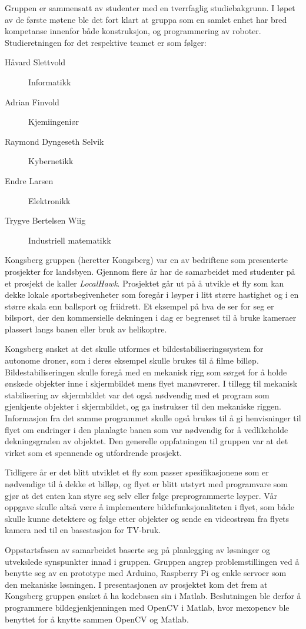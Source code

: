 Gruppen er sammensatt av studenter med en tverrfaglig studiebakgrunn. I løpet av de første møtene ble det fort klart at gruppa som en samlet enhet har bred kompetanse innenfor både konstruksjon, og programmering av roboter. Studieretningen for det respektive teamet er som følger:
%
\begin{description}
	\item[Håvard Slettvold] Informatikk
	\item[Adrian Finvold] Kjemiingeniør
	\item[Raymond Dyngeseth Selvik] Kybernetikk
	\item[Endre Larsen] Elektronikk
	\item[Trygve Bertelsen Wiig] Industriell matematikk
\end{description}
%
Kongsberg gruppen (heretter Kongsberg) var en av bedriftene som presenterte prosjekter for landsbyen. Gjennom flere år har de samarbeidet med studenter på et prosjekt de kaller \emph{LocalHawk}. Prosjektet går ut på å utvikle et fly som kan dekke lokale sportsbegivenheter som foregår i løyper i litt større hastighet og i en større skala enn ballsport og friidrett. Et eksempel på hva de ser for seg er bilsport, der den kommersielle dekningen i dag er begrenset til å bruke kameraer plassert langs banen eller bruk av helikoptre. 

Kongsberg ønsket at det skulle utformes et bildestabiliseringssystem for autonome droner, som i deres eksempel skulle brukes til å filme billøp. Bildestabiliseringen skulle foregå med en mekanisk rigg som sørget for å holde ønskede objekter inne i skjermbildet mens flyet manøvrerer. I tillegg til mekanisk stabilisering av skjermbildet var det også nødvendig med et program som gjenkjente objekter i skjermbildet, og ga instrukser til den mekaniske riggen. Informasjon fra det samme programmet skulle også brukes til å gi henvisninger til flyet om endringer i den planlagte banen som var nødvendig for å vedlikeholde dekningsgraden av objektet. Den generelle oppfatningen til gruppen var at det virket som et spennende og utfordrende prosjekt. 

Tidligere år er det blitt utviklet et fly som passer spesifikasjonene som er nødvendige til å dekke et billøp, og flyet er blitt utstyrt med programvare som gjør at det enten kan styre seg selv eller følge preprogrammerte løyper. Vår oppgave skulle altså være å implementere bildefunksjonaliteten i flyet, som både skulle kunne detektere og følge etter objekter og sende en videostrøm fra flyets kamera ned til en basestasjon for TV-bruk.

Oppstartsfasen av samarbeidet baserte seg på planlegging av løsninger og utvekslede synspunkter innad i gruppen. Gruppen angrep problemstillingen ved å benytte seg av en prototype med Arduino, Raspberry Pi og enkle servoer som den mekaniske løsningen. I presentasjonen av prosjektet kom det frem at Kongsberg gruppen ønsket å ha kodebasen sin i Matlab. Beslutningen ble derfor å programmere bildegjenkjenningen med OpenCV i Matlab, hvor mexopencv ble benyttet for å knytte sammen OpenCV og Matlab.